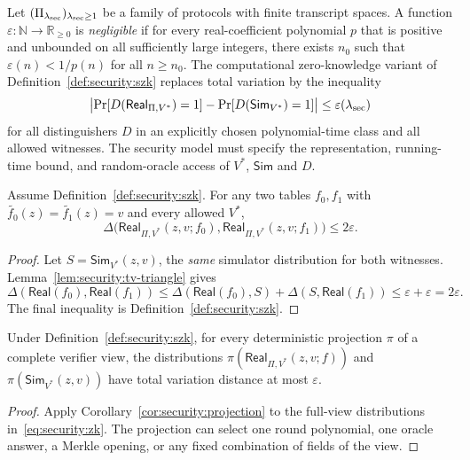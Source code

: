 \begin{definition}\label{def:security:computational}
Let $(\Pi_{\lambda_{\rm sec}})_{\lambda_{\rm sec}\geq1}$ be a family of protocols with finite transcript spaces. A function $\varepsilon:\mathbb N\to\mathbb R_{\geq0}$ is \emph{negligible} if for every real-coefficient polynomial $p$ that is positive and unbounded on all sufficiently large integers, there exists $n_0$ such that
$\varepsilon(n)<1/p(n)$ for all $n\geq n_0$.
The computational zero-knowledge variant of Definition~\ref{def:security:szk} replaces total variation by the inequality
\[
 \bigl|\Pr[D(\mathsf{Real}_{\Pi,V^*})=1]
 -\Pr[D(\mathsf{Sim}_{V^*})=1]\bigr|\leq\varepsilon(\lambda_{\rm sec})
\]
for all distinguishers $D$ in an explicitly chosen polynomial-time class and all allowed witnesses. The security model must specify the representation, running-time bound, and random-oracle access of $V^*$, $\mathsf{Sim}$ and $D$.
\end{definition}

\begin{lemma}\label{lem:security:two-witness}
Assume Definition~\ref{def:security:szk}. For any two tables $f_0,f_1$ with
$\widetilde{f_0}(z)=\widetilde{f_1}(z)=v$ and every allowed $V^*$,
\[
 \Delta\bigl(
 \mathsf{Real}_{\Pi,V^*}(z,v;f_0),
 \mathsf{Real}_{\Pi,V^*}(z,v;f_1)\bigr)\leq2\varepsilon.
\]
\end{lemma}
\begin{proof}
Let $S=\mathsf{Sim}_{V^*}(z,v)$, the \emph{same} simulator distribution for both witnesses. Lemma~\ref{lem:security:tv-triangle} gives
\[
 \Delta(\mathsf{Real}(f_0),\mathsf{Real}(f_1))
 \leq\Delta(\mathsf{Real}(f_0),S)+\Delta(S,\mathsf{Real}(f_1))
 \leq\varepsilon+\varepsilon=2\varepsilon.
\]
The final inequality is Definition~\ref{def:security:szk}.
\end{proof}

\begin{lemma}\label{lem:security:message-projection}
Under Definition~\ref{def:security:szk}, for every deterministic projection $\pi$ of a complete verifier view, the distributions
$\pi(\mathsf{Real}_{\Pi,V^*}(z,v;f))$ and
$\pi(\mathsf{Sim}_{V^*}(z,v))$ have total variation distance at most $\varepsilon$.
\end{lemma}
\begin{proof}
Apply Corollary~\ref{cor:security:projection} to the full-view distributions in~\eqref{eq:security:zk}. The projection can select one round polynomial, one oracle answer, a Merkle opening, or any fixed combination of fields of the view.
\end{proof}

